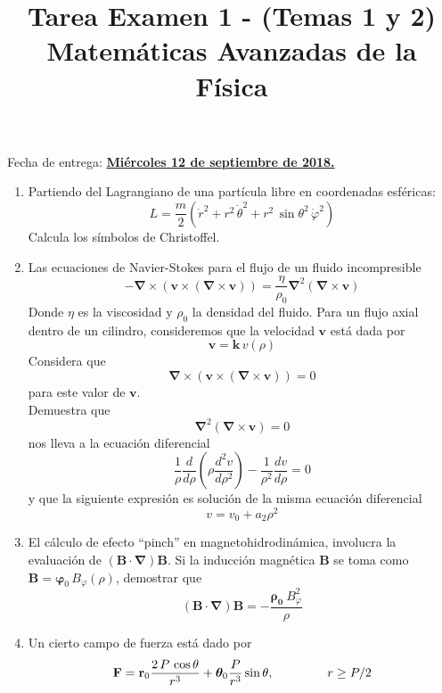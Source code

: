 
\usepackage{standalone}
\usepackage{enumerate}
\usepackage[left=1.5cm,top=1.5cm,right=1.5cm,bottom=1.5cm]{geometry}
\title{Tarea Examen 1 - (Temas 1 y 2) \\ \large{Matemáticas Avanzadas de la Física}}
\date{ }

\vspace{-4cm}
\renewcommand\labelenumii{\theenumi.{\arabic{enumii}}}
\maketitle
\fontsize{14}{14}\selectfont
Fecha de entrega: \underline{\textbf{Miércoles 12 de septiembre de 2018.}}
\begin{enumerate}
\item Partiendo del Lagrangiano de una partícula libre en coordenadas esféricas:
\[ L = \dfrac{m}{2} \left( \dot{r}^{2} + r^{2} \, \dot{\theta}^{2} + r^{2} \, \sin \theta^{2} \, \dot{\varphi}^{2} \right)\]
Calcula los símbolos de Christoffel.
\item Las ecuaciones de Navier-Stokes para el flujo de un fluido incompresible
\[ - \bm{\nabla} \times ( \mathbf{v} \times (\bm{\nabla} \times \mathbf{v} )) =  \dfrac{\eta}{\rho_{0}} \bm{\nabla}^{2} (\bm{\nabla} \times \mathbf{v}) \]
Donde $\eta$ es la viscosidad y $\rho_{0}$ la densidad del fluido. Para un flujo axial dentro de un cilindro, consideremos que la velocidad $\mathbf{v}$ está dada por
\[ \mathbf{v} =  \mathbf{k} \, v (\rho) \]
Considera que
\[ \bm{\nabla} \times (\mathbf{v} \times (\bm{\nabla} \times \mathbf{v})) = 0 \]
para este valor de $\mathbf{v}$.
\\
Demuestra que
\[ \bm{\nabla}^{2} ( \bm{\nabla} \times \mathbf{v}) = 0  \]
nos lleva a la ecuación diferencial
\[ \dfrac{1}{\rho} \dfrac{d}{d \rho} \left( \rho \dfrac{d^{2} v}{d \rho^{2}} \right) -  \dfrac{1}{\rho^{2}} \dfrac{d v}{d \rho} = 0 \]
y que la siguiente expresión es solución de la misma ecuación diferencial
\[ v = v_{0} + a_{2} \rho^{2} \]
\item El cálculo de efecto \enquote{pinch} en magnetohidrodinámica, involucra la evaluación de $(\mathbf{B} \cdot \bm{\nabla}) \mathbf{B}$. Si la inducción magnética $\mathbf{B}$ se toma como $\mathbf{B} = \bm{\varphi}_{0} \, B_{\varphi} (\rho)$, demostrar que
\[ (\mathbf{B} \cdot \bm{\nabla}) \mathbf{B} = - \dfrac{\bm{\rho_{0}} \: B_{\varphi}^{2}}{\rho}	 \]
\item Un cierto campo de fuerza está dado por
\[ \mathbf{F} = \mathbf{r}_{0} \dfrac{2 \, P \, \cos \theta}{r^{3}} + \bm{\theta}_{0} \dfrac{P}{r^{3}} \sin \theta, \hspace{1.5cm} r \geq P/2 \]

\end{enumerate}
